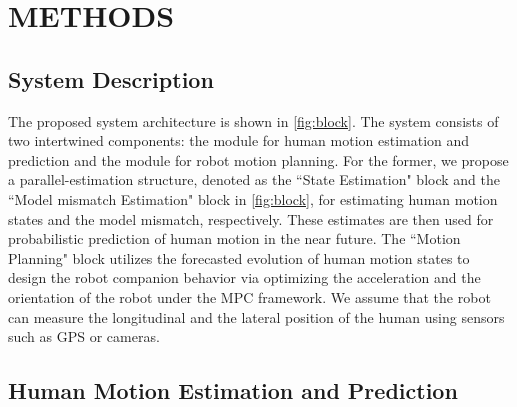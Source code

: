 \documentclass[journal]{IEEEtran}
\DeclareRobustCommand{\clnote}[1]{\ifthenelse{\boolean{include-notes}}%
{\textcolor{orange}{\textbf{CL: #1}}}{}}
\begin{document}
	\section{METHODS} \label{sec:framework}
    \subsection{System Description}\label{sec:description}
    The proposed system architecture is shown in \cref{fig:block}. 
    The system consists of two intertwined components: the module for human motion estimation and prediction and the module for robot motion planning.
   For the former, we propose a parallel-estimation structure, denoted as the ``State Estimation" block and the ``Model mismatch Estimation" block in \cref{fig:block}, for estimating human motion states and the model mismatch, respectively. 
    These estimates are then used for probabilistic prediction of human motion in the near future. %
   The ``Motion Planning" block utilizes the forecasted evolution of human motion states to design the robot companion behavior via optimizing the acceleration and the orientation of the robot under the MPC framework. 
    We assume that the robot can measure the longitudinal and the lateral position of the human using sensors such as GPS or cameras.     
	
	\subsection{Human Motion Estimation and Prediction}\label{subsec:human_track}
\end{document}
